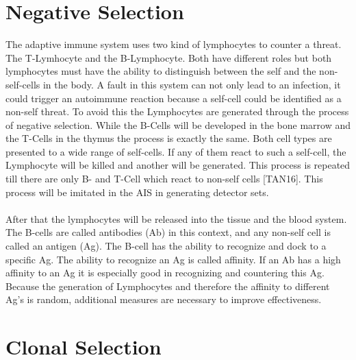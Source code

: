 \section{Negative Selection}

The adaptive immune system uses two kind of lymphocytes to counter a threat. The T-Lymhocyte and the B-Lymphocyte. Both have different roles but both lymphocytes must have the ability to distinguish between the self and the non-self-cells in the body. A fault in this system can not only lead to an infection, it could trigger an autoimmune reaction because a self-cell could be identified as a non-self threat. To avoid this the Lymphocytes are generated through the process of negative selection. While the B-Cells will be developed in the bone marrow and the T-Cells in the thymus the process is exactly the same. Both cell types are presented to a wide range of self-cells. If any of them react to such a self-cell, the Lymphocyte will be killed and another will be generated. This process is repeated till there are only B- and T-Cell which react to non-self cells [TAN16]. This process will be imitated in the AIS in generating detector sets.
\\\\
After that the lymphocytes will be released into the tissue and the blood system. The B-cells are called antibodies (Ab) in this context, and any non-self cell is called an antigen (Ag). The B-cell has the ability to recognize and dock to a specific Ag. The ability to recognize an Ag is called affinity. If an Ab has a high affinity to an Ag it is especially good in recognizing and countering this Ag. Because the generation of Lymphocytes and therefore the affinity to different Ag’s is random, additional measures are necessary to improve effectiveness.

\section{Clonal Selection}


